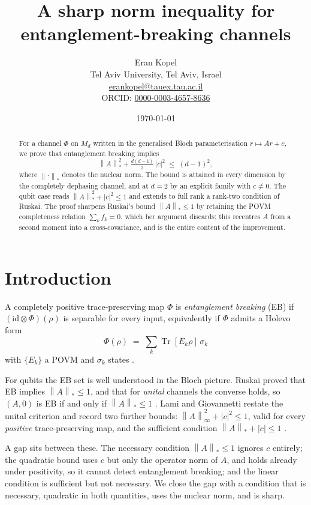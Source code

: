 \documentclass[11pt,a4paper]{article}
\title{A sharp norm inequality for entanglement-breaking channels}
\author{Eran Kopel\\[3pt]
  {\normalsize Tel Aviv University, Tel Aviv, Israel}\\[2pt]
  {\normalsize \href{mailto:erankopel@tauex.tau.ac.il}{erankopel@tauex.tau.ac.il}}\\[2pt]
  {\normalsize ORCID: \href{https://orcid.org/0000-0003-4657-8636}{0000-0003-4657-8636}}}
\date{\today}
\theoremstyle{remark}
\DeclareMathOperator{\Tr}{Tr}
\newcommand{\nuc}[1]{\left\lVert #1 \right\rVert_{*}}
\newcommand{\opn}[1]{\left\lVert #1 \right\rVert_{\infty}}
\begin{document}
\maketitle

\begin{abstract}
For a channel $\Phi$ on $M_d$ written in the generalised Bloch parameterisation $r \mapsto Ar+c$, we prove that entanglement breaking implies
\[
\nuc{A}^2 + \tfrac{d(d-1)}{2}\,|c|^2 \;\le\; (d-1)^2 ,
\]
where $\nuc{\cdot}$ denotes the nuclear norm. The bound is attained in every dimension by the completely dephasing channel, and at $d=2$ by an explicit family with $c\neq0$. The qubit case reads $\nuc{A}^2+|c|^2\le1$ and extends to full rank a rank-two condition of Ruskai. The proof sharpens Ruskai's bound $\nuc{A}\le1$ by retaining the POVM completeness relation $\sum_k f_k=0$, which her argument discards; this recentres $A$ from a second moment into a cross-covariance, and is the entire content of the improvement.
\end{abstract}

\section{Introduction}

A completely positive trace-preserving map $\Phi$ is \emph{entanglement breaking} (EB) if $(\mathrm{id}\otimes\Phi)(\rho)$ is separable for every input, equivalently if $\Phi$ admits a Holevo form
\begin{equation}\label{eq:holevo}
\Phi(\rho) \;=\; \sum_k \Tr[E_k\rho]\,\sigma_k
\end{equation}
with $\{E_k\}$ a POVM and $\sigma_k$ states \cite{HSR2003}.

For qubits the EB set is well understood in the Bloch picture. Ruskai proved that EB implies $\nuc{A}\le1$, and that for \emph{unital} channels the converse holds, so $(A,0)$ is EB if and only if $\nuc{A}\le1$ \cite{Ruskai2003}. Lami and Giovannetti restate the unital criterion and record two further bounds: $\opn{A}^2+|c|^2\le1$, valid for every \emph{positive} trace-preserving map, and the sufficient condition $\nuc{A}+|c|\le1$ \cite{LamiGiovannetti}.

A gap sits between these. The necessary condition $\nuc{A}\le1$ ignores $c$ entirely; the quadratic bound uses $c$ but only the operator norm of $A$, and holds already under positivity, so it cannot detect entanglement breaking; and the linear condition is sufficient but not necessary. We close the gap with a condition that is necessary, quadratic in both quantities, uses the nuclear norm, and is sharp.
\end{document}
